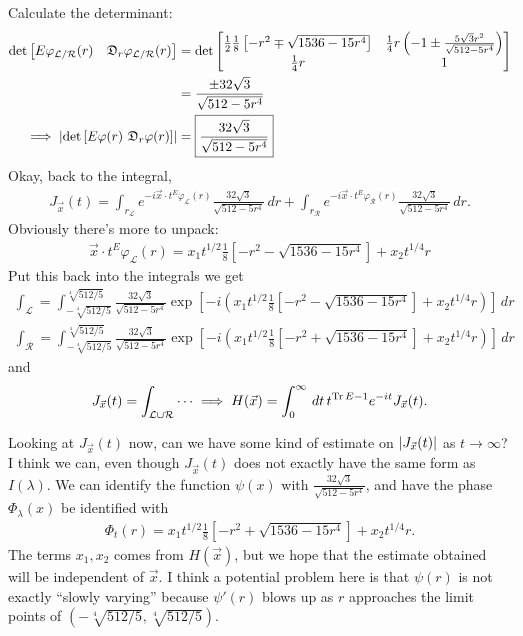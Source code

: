 \documentclass{article}
\theoremstyle{definition}
\newcommand{\lag}{\mathcal{L}}
\newcommand{\f}[2]{\frac{#1}{#2}}
\newcommand{\lp}{\left(}
\newcommand{\rp}{\right)}
\newcommand{\lb}{\left[}
\newcommand{\rb}{\right]}
\begin{document}
Calculate the determinant:
\begin{align*}
    \det\begin{bmatrix}
        E\varphi_{\lag/\mathcal{R}}(r) & \mathfrak{D}_r \varphi_{\lag/\mathcal{R}}(r)
    \end{bmatrix} 
    &=
    \det\begin{bmatrix}
    \f{1}{2}\f{1}{8}\lb - r^2 \mp \sqrt{1536 - 15r^4} \rb & \f{1}{4}r\lp -1 \pm \f{5\sqrt{3} r^2}{\sqrt{512 - 5r^4}} \rp \\
    \f{1}{4}r & 1
    \end{bmatrix}\\
    &= \f{\pm32\sqrt{3}}{\sqrt{512 - 5r^4}}\\
    \implies \abs{\det\lb E\varphi(r)\,\, \mathfrak{D}_r\varphi(r) \rb} &= \boxed{\f{32\sqrt{3}}{\sqrt{512 - 5r^4}}}
\end{align*}
Okay, back to the integral,
\begin{align*}
    J_{\vec{x}} (t) = \int_{r_\lag} e^{-i \vec{x} \cdot t^E \varphi_\lag(r)}\f{32\sqrt{3}}{\sqrt{512 - 5r^4}}\,dr + \int_{r_\mathcal{R}} e^{-i \vec{x} \cdot t^E \varphi_\mathcal{R}(r)}\f{32\sqrt{3}}{\sqrt{512 - 5r^4}}\,dr.
\end{align*}
Obviously there's more to unpack:
\begin{align*}
    \vec{x} \cdot t^E \varphi_\lag(r) =  x_1 t^{1/2}\f{1}{8}\lb -r^2 - \sqrt{1536 - 15r^4} \rb + x_2 t^{1/4} r
\end{align*}
Put this back into the integrals we get
\begin{align*}
    \int_\lag = \int_{-\sqrt[4]{512/5}}^{\sqrt[4]{512/5}} \f{32\sqrt{3}}{\sqrt{512 - 5r^4}} \exp \lb -i\lp x_1 t^{1/2}\f{1}{8}\lb -r^2 - \sqrt{1536 - 15r^4} \rb + x_2 t^{1/4} r \rp \rb\,dr\\
    \int_\mathcal{R} = \int_{-\sqrt[4]{512/5}}^{\sqrt[4]{512/5}}\f{32\sqrt{3}}{\sqrt{512 - 5r^4}} \exp \lb -i\lp x_1 t^{1/2}\f{1}{8}\lb -r^2 + \sqrt{1536 - 15r^4} \rb + x_2 t^{1/4} r \rp \rb\,dr
\end{align*}
and
\begin{align*}
    J_{\vec{x}}(t) = \int_{\lag\cup \mathcal{R}}\dots \implies H(\vec{x}) = \int^\infty_0 \,dt\, t^{\Tr E - 1}e^{-it}J_{\vec{x}}(t).
\end{align*}

Looking at $J_{\vec{x}} (t)$ now, can we have some kind of estimate on $\abs{J_{\vec{x}} (t)}$ as $t \to \infty$? I think we can, even though $J_{\vec{x}}(t)$ does not exactly have the same form as $I(\lambda)$. We can identify the function $\psi(x)$ with  $\f{32\sqrt{3}}{\sqrt{512 - 5r^4}}$, and have the phase $\Phi_\lambda(x)$ be identified with \begin{align*}
    \Phi_t(r) = x_1 t^{1/2}\f{1}{8}\lb -r^2 + \sqrt{1536 - 15r^4} \rb + x_2 t^{1/4}r.
\end{align*}
The terms $x_1,x_2$ comes from $H(\vec{x})$, but we hope that the estimate obtained will be independent of $\vec{x}$. I think a potential problem here is that $\psi(r)$ is not exactly ``slowly varying'' because $\psi'(r)$ blows up as $r$ approaches the limit points of  $(-\sqrt[4]{512/5},\sqrt[4]{512/5})$.\\
\end{document}
